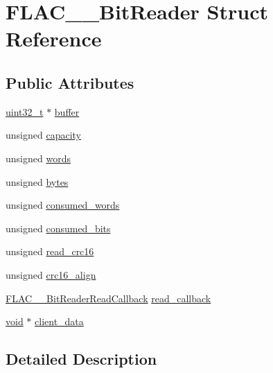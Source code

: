 \hypertarget{struct_f_l_a_c_____bit_reader}{}\section{F\+L\+A\+C\+\_\+\+\_\+\+Bit\+Reader Struct Reference}
\label{struct_f_l_a_c_____bit_reader}
\subsection*{Public Attributes}
\begin{DoxyCompactItemize}
\item 
\hyperlink{lib-src_2ffmpeg_2win32_2stdint_8h_a6eb1e68cc391dd753bc8ce896dbb8315}{uint32\+\_\+t} $\ast$ \hyperlink{struct_f_l_a_c_____bit_reader_a12eadf61501c9ad763b8ef3c6ec0cda7}{buffer}
\item 
unsigned \hyperlink{struct_f_l_a_c_____bit_reader_af69ebfd4017982d3bef49d4081ce3476}{capacity}
\item 
unsigned \hyperlink{struct_f_l_a_c_____bit_reader_ab0b2525d374daa1d4a28f5ad9c96335c}{words}
\item 
unsigned \hyperlink{struct_f_l_a_c_____bit_reader_a0d45dadb4f3236aabfb9174b436b27e9}{bytes}
\item 
unsigned \hyperlink{struct_f_l_a_c_____bit_reader_acc36e1ebb1103e387b4eda1a6a0a5d63}{consumed\+\_\+words}
\item 
unsigned \hyperlink{struct_f_l_a_c_____bit_reader_a030662de9ae58821ada8c29d37a75366}{consumed\+\_\+bits}
\item 
unsigned \hyperlink{struct_f_l_a_c_____bit_reader_a2d84d8d8813d1a43f6103dbac53bf260}{read\+\_\+crc16}
\item 
unsigned \hyperlink{struct_f_l_a_c_____bit_reader_ae02c8b7b3088a28cd76d2c63cd7fdb7d}{crc16\+\_\+align}
\item 
\hyperlink{bitreader_8h_a0c06be76d05b61ca81a7e26d90e3534e}{F\+L\+A\+C\+\_\+\+\_\+\+Bit\+Reader\+Read\+Callback} \hyperlink{struct_f_l_a_c_____bit_reader_ad533a2853a46d2204805798b89a17aab}{read\+\_\+callback}
\item 
\hyperlink{sound_8c_ae35f5844602719cf66324f4de2a658b3}{void} $\ast$ \hyperlink{struct_f_l_a_c_____bit_reader_ad7599e57368bc065e9e062a322a1302b}{client\+\_\+data}
\end{DoxyCompactItemize}


\subsection{Detailed Description}


